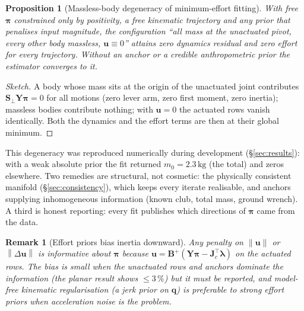 \documentclass[11pt,a4paper]{article}
\newtheorem{proposition}{Proposition}
\newtheorem{remark}{Remark}
\newcommand{\bq}{\mathbf{q}}
\newcommand{\bu}{\mathbf{u}}
\newcommand{\bY}{\mathbf{Y}}
\newcommand{\bB}{\mathbf{B}}
\newcommand{\bJ}{\mathbf{J}}
\newcommand{\bS}{\mathbf{S}}
\newcommand{\bpi}{\boldsymbol{\pi}}
\newcommand{\blambda}{\boldsymbol{\lambda}}
\newcommand{\norm}[1]{\left\lVert #1 \right\rVert}
\begin{document}
\begin{proposition}[Massless-body degeneracy of minimum-effort fitting]
\label{prop:massless}
With free $\bpi$ constrained only by positivity, a free kinematic trajectory
and any prior that penalises input magnitude, the configuration
``all mass at the unactuated pivot, every other body massless, $\bu\equiv0$''
attains zero dynamics residual and zero effort for \emph{every} trajectory.
Without an anchor or a credible anthropometric prior the estimator converges to
it.
\end{proposition}
\begin{proof}[Sketch]
A body whose mass sits at the origin of the unactuated joint contributes
$\bS_\perp\bY\bpi=0$ for all motions (zero lever arm, zero first moment, zero
inertia); massless bodies contribute nothing; with $\bu=0$ the actuated rows
vanish identically.  Both the dynamics and the effort terms are then at their
global minimum.
\end{proof}
This degeneracy was reproduced numerically during development (\S\ref{sec:results}):
with a weak absolute prior the fit returned $m_0=2.3\,\mathrm{kg}$ (the total)
and zeros elsewhere.  Two remedies are structural, not cosmetic: the
physically consistent manifold (\S\ref{sec:consistency}), which keeps every
iterate realisable, and anchors supplying inhomogeneous information (known
club, total mass, ground wrench).  A third is honest reporting: every fit
publishes which directions of $\bpi$ came from the data.

\begin{remark}[Effort priors bias inertia downward]
Any penalty on $\norm{\bu}$ or $\norm{\Delta\bu}$ is informative about
$\bpi$ because $\bu=\bB^{+}(\bY\bpi-\bJ_c^{\!\top}\blambda)$ on the actuated
rows.  The bias is small when the unactuated rows and anchors dominate the
information (the planar result shows $\le3\,\%$) but it must be reported, and
model-free kinematic regularisation (a jerk prior on $\bq$) is preferable to
strong effort priors when acceleration noise is the problem.
\end{remark}
\end{document}
